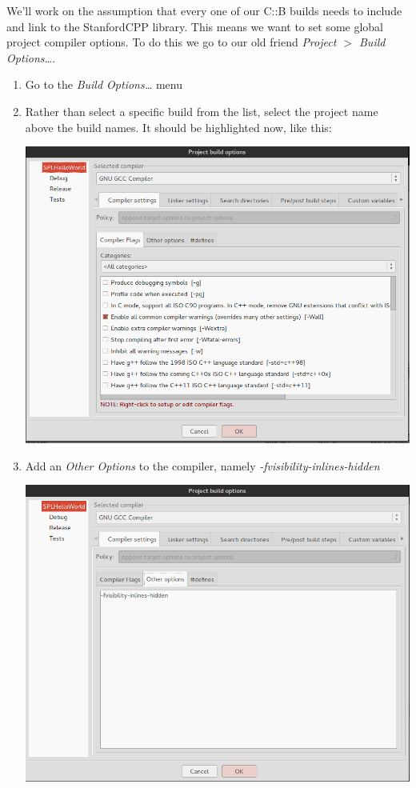 \documentclass[10pt]{article}
\begin{document}
We'll work on the assumption that every one of our C::B builds needs to include and link to the StanfordCPP library. This means we want to set some global project compiler options. To do this we go to our old friend \textit{Project $>$ Build Options\ldots}.
\begin{enumerate}
\item Go to the \textit{Build Options\ldots} menu
\item Rather than select a specific build from the list, select the project name above the build names. It should be highlighted now, like this:

\vspace{.1in}
\begin{center}
\includegraphics[scale=.4]{buildOpts-proj.png}
\end{center}
\vspace{.1in}

\item Add an \textit{Other Options} to the compiler, namely \textit{-fvisibility-inlines-hidden}

\vspace{.1in}
\begin{center}
\includegraphics[scale=.4]{scpplib-compopts.png}
\end{center}
\vspace{.1in}


\end{enumerate}
\end{document}
